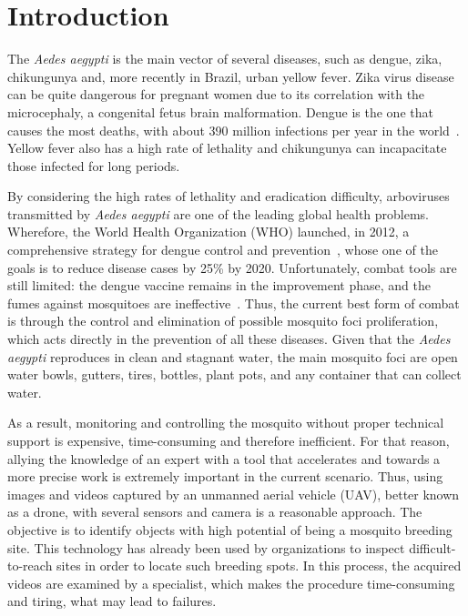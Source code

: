 \chapter{Introduction}
\label{chap:intro}

The \emph{Aedes aegypti} is the main vector of several diseases, such as dengue, zika, chikungunya and, more recently in Brazil, urban yellow fever.
Zika virus disease can be quite dangerous for pregnant women due to its correlation with the microcephaly, a congenital fetus brain malformation.
Dengue is the one that causes the most deaths, with about 390 million infections per year in the world~\cite{bhatt2013global}.
Yellow fever also has a high rate of lethality and chikungunya can incapacitate those infected for long periods.

By considering the high rates of lethality and eradication difficulty, arboviruses transmitted by \emph{Aedes aegypti} are one of the leading global health problems.
Wherefore, the World Health Organization (WHO) launched, in 2012, a comprehensive strategy for dengue control and prevention~\cite{world2012global}, whose one of the goals is to reduce disease cases by 25\% by 2020.
Unfortunately, combat tools are still limited: the dengue vaccine remains in the improvement phase, and the fumes against mosquitoes are ineffective~\cite{newton1992model}.
Thus, the current best form of combat is through the control and elimination of possible mosquito foci proliferation, which acts directly in the prevention of all these diseases.
Given that the \emph{Aedes aegypti} reproduces in clean and stagnant water, the main mosquito foci are open water bowls, gutters, tires, bottles, plant pots, and any container that can collect water.


As a result, monitoring and controlling the mosquito without proper technical support is expensive, time-consuming and therefore inefficient.
For that reason, allying the knowledge of an expert with a tool that accelerates and towards a more precise work is extremely important in the current scenario.
Thus, using images and videos captured by an unmanned aerial vehicle (UAV), better known as a drone, with several sensors and camera is a reasonable approach.
The objective is to identify objects with high potential of being a mosquito breeding site.
This technology has already been used by organizations to inspect difficult-to-reach sites in order to locate such breeding spots.
In this process, the acquired videos are examined by a specialist, which makes the procedure time-consuming and tiring, what may lead to failures.

